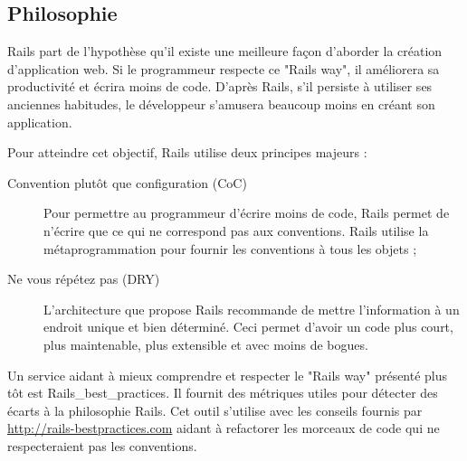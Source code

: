 \subsection{Philosophie}
Rails part de l'hypothèse qu'il existe une meilleure façon d'aborder la création d'application web. Si le programmeur respecte ce "Rails way", il améliorera sa productivité et écrira moins de code. D'après Rails, s’il persiste à utiliser ses anciennes habitudes, le développeur s'amusera beaucoup moins en créant son application.

Pour atteindre cet objectif, Rails utilise deux principes majeurs :
\begin{description}
  \item[Convention plutôt que configuration (CoC)] Pour permettre au programmeur d'écrire moins de code, Rails permet de n'écrire que ce qui ne correspond pas aux conventions. Rails utilise la métaprogrammation pour fournir les conventions à tous les objets ;
  \item[Ne vous répétez  pas (DRY)] L'architecture que propose Rails recommande de mettre l'information à un endroit unique et bien déterminé. Ceci permet d'avoir un code plus court, plus maintenable, plus extensible et avec moins de bogues.
\end{description}

Un service aidant à mieux comprendre et respecter le "Rails way" présenté plus tôt est Rails\_best\_practices. Il fournit des métriques utiles pour détecter des écarts à la philosophie Rails. Cet outil s'utilise avec les conseils fournis par \url{http://rails-bestpractices.com} aidant à refactorer les morceaux de code qui ne respecteraient pas les conventions.

